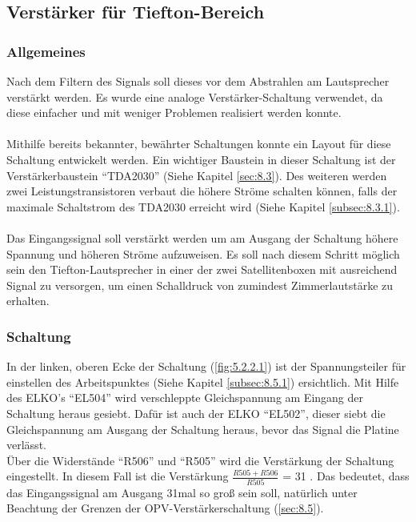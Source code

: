 \newpage
\subsection{Verstärker für Tiefton-Bereich}
\subsubsection{Allgemeines}\label{subsec:5.2.1}
Nach dem Filtern des Signals soll dieses vor dem Abstrahlen am Lautsprecher verstärkt werden.
Es wurde eine analoge Verstärker-Schaltung verwendet, da diese einfacher und mit weniger Problemen realisiert werden konnte.
\\ \\
Mithilfe bereits bekannter, bewährter Schaltungen konnte ein Layout für diese Schaltung entwickelt werden.
Ein wichtiger Baustein in dieser Schaltung ist der Verstärkerbaustein \enquote{TDA2030} (Siehe Kapitel \ref{sec:8.3}).
Des weiteren werden zwei Leistungstransistoren verbaut die höhere Ströme schalten können, falls der maximale Schaltstrom des TDA2030 erreicht wird (Siehe Kapitel \ref{subsec:8.3.1}).
\\ \\
Das Eingangssignal soll verstärkt werden um am Ausgang der Schaltung höhere Spannung und höheren Ströme aufzuweisen.
Es soll nach diesem Schritt möglich sein den Tiefton-Lautsprecher in einer der zwei Satellitenboxen mit ausreichend Signal zu versorgen, um einen Schalldruck von zumindest Zimmerlautstärke zu erhalten. 

\newpage
\subsubsection{Schaltung}\label{subsec:5.2.2}
In der linken, oberen Ecke der Schaltung (\ref{fig:5.2.2.1}) ist der Spannungsteiler für einstellen des Arbeitspunktes (Siehe Kapitel \ref{subsec:8.5.1}) ersichtlich.
Mit Hilfe des ELKO's \enquote{EL504} wird verschleppte Gleichspannung am Eingang der Schaltung heraus gesiebt.
Dafür ist auch der ELKO \enquote{EL502}, dieser siebt die Gleichspannung am Ausgang der Schaltung heraus, bevor das Signal die Platine verlässt. \\
Über die Widerstände \enquote{R506} und \enquote{R505} wird die Verstärkung der Schaltung eingestellt.
In diesem Fall ist die Verstärkung $\frac{R505+R506}{R505}$ = 31 .
Das bedeutet, dass das Eingangssignal am Ausgang 31mal so groß sein soll, natürlich unter Beachtung der Grenzen der OPV-Verstärkerschaltung (\ref{sec:8.5}).


